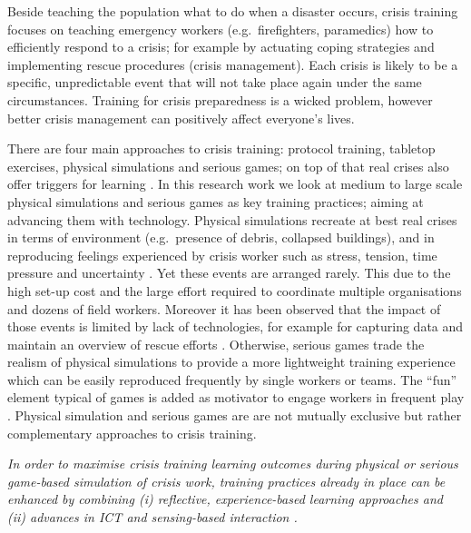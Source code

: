 Beside teaching the population what to do when a disaster occurs, crisis
training focuses on teaching emergency workers (e.g.~firefighters,
paramedics) how to efficiently respond to a crisis; for example by
actuating coping strategies and implementing rescue procedures (crisis
management). Each crisis is likely to be a specific, unpredictable event
that will not take place again under the same circumstances. Training
for crisis preparedness is a wicked problem, however better crisis
management can positively affect everyone's lives.

There are four main approaches to crisis training: protocol training,
tabletop exercises, physical simulations and serious games; on top of
that real crises also offer triggers for learning
\autocite{Deverell:2009fk}. In this research work we look at medium to
large scale physical simulations and serious games as key training
practices; aiming at advancing them with technology. Physical
simulations recreate at best real crises in terms of environment
(e.g.~presence of debris, collapsed buildings), and in reproducing
feelings experienced by crisis worker such as stress, tension, time
pressure and uncertainty \autocite{Borodzicz:2002em}. Yet these events
are arranged rarely. This due to the high set-up cost and the large
effort required to coordinate multiple organisations and dozens of field
workers. Moreover it has been observed that the impact of those events
is limited by lack of technologies, for example for capturing data and
maintain an overview of rescue efforts \autocite{Kyng:2006he}.
Otherwise, serious games trade the realism of physical simulations to
provide a more lightweight training experience which can be easily
reproduced frequently by single workers or teams. The ``fun'' element
typical of games is added as motivator to engage workers in frequent
play \autocite{DiLoreto:2012jj}. Physical simulation and serious games
are are not mutually exclusive but rather complementary approaches to
crisis training.

\emph{In order to maximise crisis training learning outcomes during
physical or serious game-based simulation of crisis work, training
practices already in place can be enhanced by combining (i) reflective,
experience-based learning approaches and (ii) advances in ICT and
sensing-based interaction \autocite{Zhai:2005jm}.}


